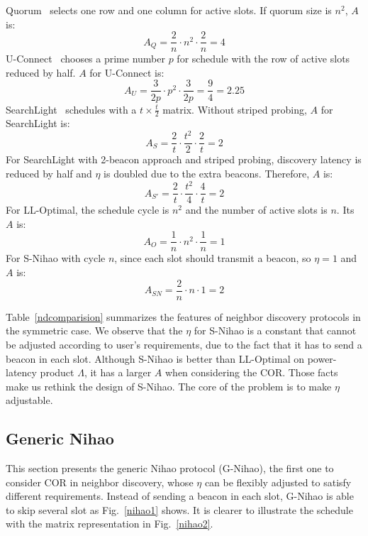 \documentclass[conference]{IEEEtran}
\begin{document}
Quorum~\cite{tseng2003power} selects one row and one column for active slots.
If quorum size is $n^2$, $A$ is:
\begin{displaymath}
    A_Q = \frac{2}{n} \cdot n^2 \cdot \frac{2}{n} = 4
\end{displaymath}
U-Connect~\cite{kandhalu2010u} chooses a prime number $p$ for schedule with the row of active slots reduced by half. $A$ for U-Connect is:
\begin{displaymath}
    A_U = \frac{3}{2p} \cdot p^2 \cdot \frac{3}{2p} = \frac{9}{4} = 2.25
\end{displaymath}
SearchLight~\cite{bakht2012mobicom} schedules with a $t \times \frac{t}{2}$ matrix. Without striped probing, $A$ for SearchLight is:
\begin{displaymath}
    A_S = \frac{2}{t} \cdot \frac{t^2}{2} \cdot \frac{2}{t} = 2
\end{displaymath}
For SearchLight with 2-beacon approach and striped probing, discovery latency is reduced by half and $\eta$ is doubled due to the extra beacons.
Therefore, $A$ is:
\begin{displaymath}
    A_{S'} = \frac{2}{t} \cdot \frac{t^2}{4} \cdot \frac{4}{t} = 2
\end{displaymath}
For LL-Optimal, the schedule cycle is $n^2$ and the number of active slots is $n$. Its $A$ is:
\begin{displaymath}
    A_O = \frac{1}{n} \cdot n^2 \cdot \frac{1}{n} = 1
\end{displaymath}
For S-Nihao with cycle $n$, since each slot should transmit a beacon, so $\eta=1$ and $A$ is:
\begin{displaymath}
    A_{SN} = \frac{2}{n} \cdot n \cdot 1 = 2
\end{displaymath}

Table~\ref{ndcomparision} summarizes the features of neighbor discovery protocols in the symmetric case.
We observe that the $\eta$ for S-Nihao is a constant that cannot be adjusted according to user's requirements,
due to the fact that it has to send a beacon in each slot.
Although S-Nihao is better than LL-Optimal on power-latency product $\Lambda$,
it has a larger $A$ when considering the COR.
Those facts make us rethink the design of S-Nihao.
The core of the problem is to make $\eta$ adjustable.

\subsection{Generic Nihao}
This section presents the generic Nihao protocol (G-Nihao), the first one to consider COR in neighbor discovery,
whose $\eta$ can be flexibly adjusted to satisfy different requirements.
Instead of sending a beacon in each slot, G-Nihao is able to skip several slot as Fig.~\ref{nihao1} shows.
It is clearer to illustrate the schedule with the matrix representation in Fig.~\ref{nihao2}.
\end{document}
